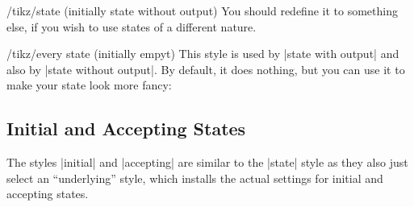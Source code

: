 \begin{stylekey}{/tikz/state (initially state without output)}
  You should redefine it to something else, if you wish to use states
  of a different nature.
\begin{codeexample}[]
\end{codeexample}
\end{stylekey}

\begin{stylekey}{/tikz/every state (initially \normalfont empyt)}
  This style is used by |state with output| and also by
  |state without output|. By default, it does nothing, but you can use
  it to make your state look more fancy:
\begin{codeexample}[]
\end{codeexample}
\end{stylekey}


\subsection{Initial and Accepting States}

The styles |initial| and |accepting| are similar to the |state| style
as they also just select an ``underlying'' style, which installs the
actual settings for initial and accepting states.

